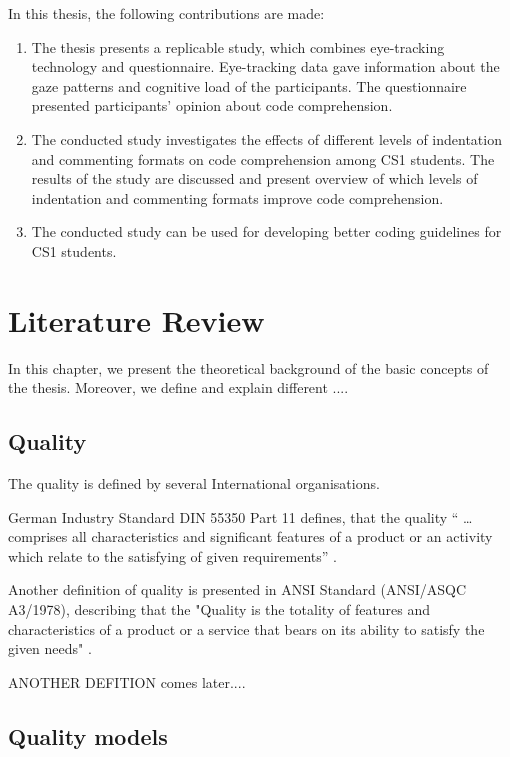 In this thesis, the following contributions are made:
\begin{enumerate}

\item The thesis presents a replicable study, which combines eye-tracking technology and questionnaire. Eye-tracking data gave information about the gaze patterns and cognitive load of the participants. The questionnaire presented participants’ opinion about code comprehension.

\item  The conducted study investigates the effects of different levels of indentation and commenting formats on code comprehension among CS1 students. The results of the study are discussed and present overview of which levels of indentation and commenting formats improve code comprehension.

\item The conducted study can be used for developing better coding guidelines for CS1 students.

\end{enumerate}

\chapter{Literature Review}
In this chapter, we present the theoretical background of the basic concepts of the thesis. Moreover, we define and explain different ....


\section{Quality}
The quality is defined by several International organisations.

German Industry Standard DIN 55350 Part 11 defines, that the quality “ … comprises all characteristics and significant features of a product or an activity which relate to the satisfying of given requirements” \cite{fitzpatrick1996software}.

Another definition of quality is presented in ANSI Standard (ANSI/ASQC A3/1978), describing that the "Quality is the totality of features and characteristics of a product or a service that bears on its ability to satisfy the given needs"  \cite{fitzpatrick1996software}.

ANOTHER DEFITION comes later....

\section{Quality models}

